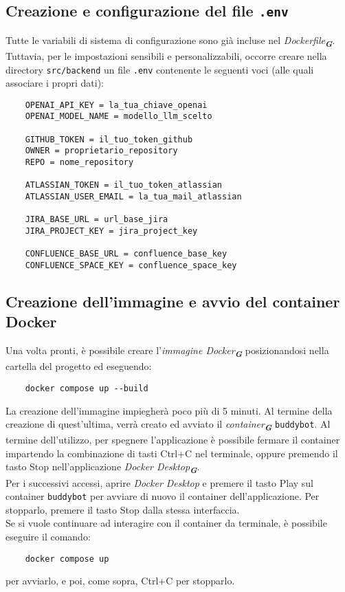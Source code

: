 \subsection{Creazione e configurazione del file \texttt{.env}}
Tutte le variabili di sistema di configurazione sono già incluse nel \emph{Dockerfile}\textsubscript{\textbf{\textit{G}}}.  
Tuttavia, per le impostazioni sensibili e personalizzabili, occorre creare nella directory \texttt{src/backend} un file
\texttt{.env} contenente le seguenti voci (alle quali associare i propri dati):
\begin{verbatim}
    OPENAI_API_KEY = la_tua_chiave_openai
    OPENAI_MODEL_NAME = modello_llm_scelto

    GITHUB_TOKEN = il_tuo_token_github
    OWNER = proprietario_repository
    REPO = nome_repository

    ATLASSIAN_TOKEN = il_tuo_token_atlassian
    ATLASSIAN_USER_EMAIL = la_tua_mail_atlassian

    JIRA_BASE_URL = url_base_jira
    JIRA_PROJECT_KEY = jira_project_key

    CONFLUENCE_BASE_URL = confluence_base_key
    CONFLUENCE_SPACE_KEY = confluence_space_key
\end{verbatim}

\subsection{Creazione dell'immagine e avvio del container Docker}
Una volta pronti, è possibile creare l'\emph{immagine Docker}\textsubscript{\textbf{\textit{G}}} posizionandosi nella cartella del progetto ed eseguendo:
\begin{verbatim}
    docker compose up --build
\end{verbatim}
La creazione dell'immagine impiegherà poco più di 5 minuti.
Al termine della creazione di quest'ultima, verrà creato ed avviato il \emph{container}\textsubscript{\textbf{\textit{G}}} \texttt{buddybot}. Al termine dell'utilizzo, per
spegnere l'applicazione è possibile fermare il container impartendo la combinazione di tasti Ctrl+C nel terminale, oppure premendo il tasto Stop nell'applicazione \emph{Docker Desktop}\textsubscript{\textbf{\textit{G}}}.\\
Per i successivi accessi, aprire \emph{Docker Desktop} e premere il tasto Play sul container \texttt{buddybot} per avviare di nuovo il
container dell'applicazione. Per stopparlo, premere il tasto Stop dalla stessa interfaccia.\\
Se si vuole continuare ad interagire con il container da terminale, è possibile eseguire il comando:
\begin{verbatim}
    docker compose up
\end{verbatim}
per avviarlo, e poi, come sopra, Ctrl+C per stopparlo.

